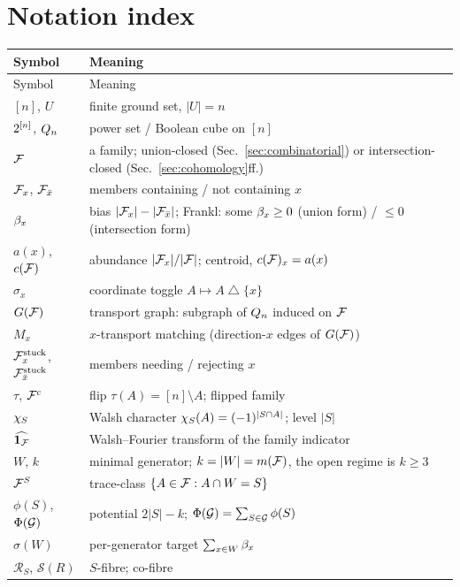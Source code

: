 \appendix

\section{Notation index}
\label{sec:appendix-notation}

\begin{longtable}{p{}p{}}
\toprule
Symbol & Meaning \\
\midrule
\endfirsthead
\toprule
Symbol & Meaning \\
\midrule
\endhead
\bottomrule
\endfoot
$[n]$, $U$ & finite ground set, $|U|=n$ \\
$2^{[n]}$, $Q_n$ & power set / Boolean cube on $[n]$ \\
$\mathcal{F}$ & a family; union-closed (Sec.~\ref{sec:combinatorial}) or intersection-closed (Sec.~\ref{sec:cohomology}ff.) \\
$\mathcal{F}_x$, $\mathcal{F}_{\bar x}$ & members containing / not containing $x$ \\
$\beta_x$ & bias $|\mathcal{F}_x|-|\mathcal{F}_{\bar x}|$; Frankl: some $\beta_x\ge0$ (union form) / $\le0$ (intersection form) \\
$a(x)$, $c(\mathcal{F})$ & abundance $|\mathcal{F}_x|/|\mathcal{F}|$; centroid, $c(\mathcal{F})_x=a(x)$ \\
$\sigma_x$ & coordinate toggle $A\mapsto A\bigtriangleup\{x\}$ \\
$G(\mathcal{F})$ & transport graph: subgraph of $Q_n$ induced on $\mathcal{F}$ \\
$M_x$ & $x$-transport matching (direction-$x$ edges of $G(\mathcal{F})$) \\
$\mathcal{F}^{\mathrm{stuck}}_x$, $\mathcal{F}^{\mathrm{stuck}}_{\bar x}$ & members needing / rejecting $x$ \\
$\tau$, $\mathcal{F}^c$ & flip $\tau(A)=[n]\setminus A$; flipped family \\
$\chi_{S}$ & Walsh character $\chi_{S}(A)=(-1)^{|S\cap A|}$; level $|S|$ \\
$\widehat{\mathbf1_{\mathcal{F}}}$ & Walsh--Fourier transform of the family indicator \\
$W$, $k$ & minimal generator; $k=|W|=m(\mathcal{F})$, the open regime is $k\ge3$ \\
$\mathcal{F}^S$ & trace-class $\{A\in\mathcal{F}:A\cap W=S\}$ \\
$\phi(S)$, $\Phi(\mathcal{G})$ & potential $2|S|-k$; $\Phi(\mathcal{G})=\sum_{S\in\mathcal{G}}\phi(S)$ \\
$\sigma(W)$ & per-generator target $\sum_{x\in W}\beta_x$ \\
$\mathcal R_S$, $\mathcal S(R)$ & $S$-fibre; co-fibre \\

\end{longtable}
